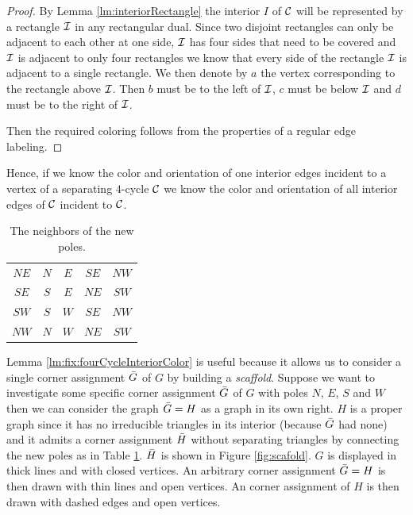   \begin{proof}
  By Lemma \ref{lm:interiorRectangle} the interior $I$ of $\mathcal{C}$ will be represented by a rectangle $\mathcal{I}$ in any rectangular dual. Since two disjoint rectangles can only be adjacent to each other at one side, $\mathcal{I}$ has four sides that need to be covered and $\mathcal{I}$ is adjacent to only four rectangles we know that every side of the rectangle $\mathcal{I}$ is adjacent to a single rectangle. We then denote by $a$ the vertex corresponding to the rectangle above $\mathcal{I}$. Then $b$ must be to the left of $\mathcal{I}$, $c$ must be below $\mathcal{I}$ and $d$ must be to the right of $\mathcal{I}$.

  Then the required coloring follows from the properties of a regular edge labeling.

  \end{proof}

  Hence, if we know the color and orientation of one interior edges incident to a vertex of a separating $4$-cycle $\mathcal{C}$ we know the color and orientation of all interior edges of $\mathcal{C}$ incident to $\mathcal{C}$.

  \begin{table}
    \centering
    \begin{tabular}{c|| c c c c}
      $NE$ & $N$ & $ E$ & $ SE$ & $ NW$ \\
      $SE$ & $S$ & $ E$ & $ NE$ & $ SW$\\
      $SW$ & $S$ & $ W$ & $ SE$ & $ NW$\\
      $NW$ & $N$ & $ W$ & $ NE$ & $ SW$\\
    \end{tabular}
    \caption{The neighbors of the new poles.}
    \label{tab:scaffold}
  \end{table}

  Lemma \ref{lm:fix:fourCycleInteriorColor} is useful because it allows us to consider a single corner assignment $\bar{G}$ of $G$ by building a \emph{scaffold}. Suppose we want to investigate some specific corner assignment $\bar{G}$ of $G$ with poles $N$, $E$, $S$ and $W$ then we can consider the graph $\bar{G} = H$ as a graph in its own right.
   $H$ is a proper graph since it has no irreducible triangles in its interior (because $\bar{G}$ had none) and it admits a corner assignment $\bar{H}$ without separating triangles by connecting the new poles as in Table \ref{tab:scaffold}. $\bar{H}$ is shown in Figure \ref{fig:scafold}. $G$ is displayed in thick lines and with closed vertices. An arbitrary corner assignment $\bar{G} =H$ is then drawn with thin lines and open vertices. An corner assignment of $H$ is then drawn with dashed edges and open vertices.


